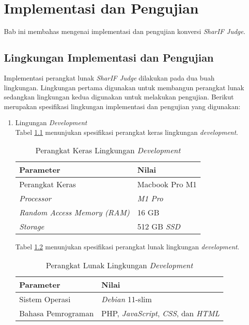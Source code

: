 \chapter{Implementasi dan Pengujian}
\label{chap:implementasidanpengujian}
Bab ini membahas mengenai implementasi dan pengujian konversi \textit{SharIF Judge}.
\section{Lingkungan Implementasi dan Pengujian}
Implementasi perangkat lunak \textit{SharIF Judge} dilakukan pada dua buah lingkungan. Lingkungan pertama digunakan untuk membangun perangkat lunak sedangkan lingkungan kedua digunakan untuk melakukan pengujian. Berikut merupakan spesifikasi lingkungan implementasi dan pengujian yang digunakan:

\begin{enumerate}
	\item Lingungan \textit{Development}\\
	Tabel \ref{tab:devhard} menunjukan spesifikasi perangkat keras lingkungan \textit{development}.
	\begin{table}[H]
 	\caption{Perangkat Keras Lingkungan \textit{Development}}
	\label{tab:devhard}
    \centering
    	\begin{tabular}{|l|l|}
    	\hline
        	\textbf{Parameter} & \textbf{Nilai} \\ \hline
        	Perangkat Keras & Macbook Pro M1 \\ \hline
        	\textit{Processor} & \textit{M1 Pro} \\ \hline
        	\textit{Random Access Memory (RAM)} & 16 GB \\ \hline
        	\textit{Storage} & 512 GB \textit{SSD} \\ \hline
    	\end{tabular}
	\end{table}
	Tabel \ref{tab:devsoft} menunjukan spesifikasi perangkat lunak lingkungan \textit{development}.
 	\begin{table}[H]
 	\caption{Perangkat Lunak Lingkungan \textit{Development}}
	\label{tab:devsoft}
    \centering
    	\begin{tabular}{|l|l|}
    	\hline
        	\textbf{Parameter} & \textbf{Nilai} \\ \hline
        	Sistem Operasi & \textit{Debian} 11-slim \\ \hline
        	Bahasa Pemrograman & PHP, \textit{JavaScript}, \textit{CSS}, dan \textit{HTML} \\ \hline

\end{tabular}
\end{table}
\end{enumerate}
